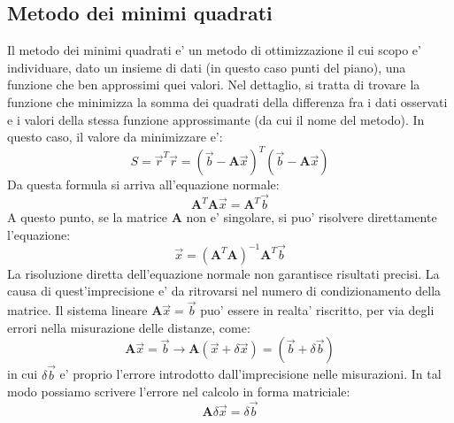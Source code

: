 \subsection{Metodo dei minimi quadrati}
Il metodo dei minimi quadrati e' un metodo di ottimizzazione il cui scopo e' individuare, dato un insieme di dati (in questo caso punti del piano), una funzione che ben approssimi quei valori. Nel dettaglio, si tratta di trovare la funzione che minimizza la somma dei quadrati della differenza fra i dati osservati e i valori della  stessa funzione approssimante (da cui il nome del metodo).\newline
In questo caso, il valore da minimizzare e': \newline
\begin{equation}
S = \overrightarrow{r}^T\overrightarrow{r} = (\overrightarrow{b}-\textbf{A}\overrightarrow{x})^T(\overrightarrow{b}-\textbf{A}\overrightarrow{x})
\end{equation}
\newline
Da questa formula si arriva all'equazione normale:\newline
\begin{equation}
\textbf{A}^T\textbf{A}\overrightarrow{x} = \textbf{A}^T\overrightarrow{b}
\end{equation}
\newline
A questo punto, se la matrice $\textbf{A}$ non e' singolare, si puo' risolvere direttamente l'equazione:\newline
\[\overrightarrow{x} = (\textbf{A}^T\textbf{A})^{-1}\textbf{A}^T\overrightarrow{b}\]
La risoluzione diretta dell'equazione normale non garantisce risultati precisi. La causa di quest'imprecisione e' da ritrovarsi nel numero di condizionamento della matrice. Il sistema lineare $\textbf{A}\overrightarrow{x} = \overrightarrow{b}$ puo' essere in realta' riscritto, per via degli errori nella misurazione delle distanze, come: \newline
\begin{equation}
\textbf{A}\overrightarrow{x} = \overrightarrow{b} \rightarrow \textbf{A}(\overrightarrow{x}+\delta\overrightarrow{x}) = (\overrightarrow{b}+\delta\overrightarrow{b})
\end{equation}
\newline
in cui $\delta\overrightarrow{b}$ e' proprio l'errore introdotto dall'imprecisione nelle misurazioni.
In tal modo possiamo scrivere l'errore nel calcolo in forma matriciale:\newline
\begin{equation}
\textbf{A}\delta\overrightarrow{x} = \delta\overrightarrow{b}
\end{equation}
